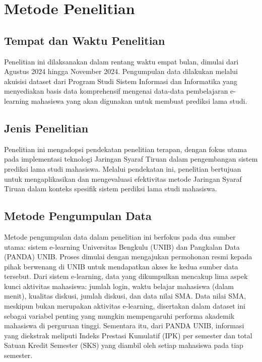 \chapter{Metode Penelitian}

\section{Tempat dan Waktu Penelitian}

Penelitian ini dilaksanakan dalam rentang waktu empat bulan, dimulai dari Agustus 2024 hingga November 2024. Pengumpulan data dilakukan melalui akuisisi dataset dari Program Studi Sistem Informasi dan Informatika yang menyediakan basis data komprehensif mengenai data-data pembelajaran e-learning mahasiswa yang akan digunakan untuk membuat prediksi lama studi.

\section{Jenis Penelitian}

Penelitian ini mengadopsi pendekatan penelitian terapan, dengan fokus utama pada implementasi teknologi Jaringan Syaraf Tiruan dalam pengembangan sistem prediksi lama studi mahasiswa. Melalui pendekatan ini, penelitian bertujuan untuk mengaplikasikan dan mengevaluasi efektivitas metode Jaringan Syaraf Tiruan dalam konteks spesifik sistem perdiksi lama studi mahasiswa.

\section{Metode Pengumpulan Data}

Metode pengumpulan data dalam penelitian ini berfokus pada dua sumber utama: sistem e-learning Universitas Bengkulu (UNIB) dan Pangkalan Data (PANDA) UNIB. Proses dimulai dengan mengajukan permohonan resmi kepada pihak berwenang di UNIB untuk mendapatkan akses ke kedua sumber data tersebut. Dari sistem e-learning, data yang dikumpulkan mencakup lima aspek kunci aktivitas mahasiswa: jumlah login, waktu belajar mahasiswa (dalam menit), kualitas diskusi, jumlah diskusi, dan data nilai SMA. Data nilai SMA, meskipun bukan merupakan aktivitas e-learning, disertakan dalam dataset ini sebagai variabel penting yang mungkin mempengaruhi performa akademik mahasiswa di perguruan tinggi. Sementara itu, dari PANDA UNIB, informasi yang diekstrak meliputi Indeks Prestasi Kumulatif (IPK) per semester dan total Satuan Kredit Semester (SKS) yang diambil oleh setiap mahasiswa pada tiap semester.

